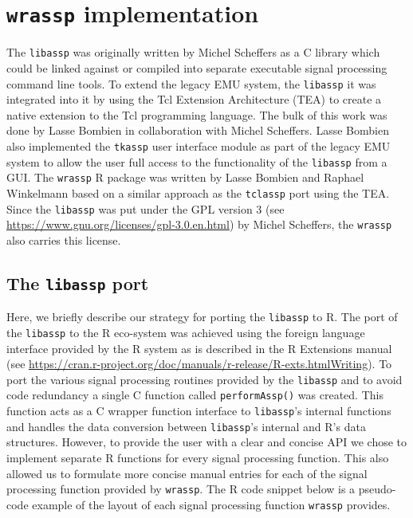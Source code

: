 \documentclass[]{book}
\theoremstyle{definition}
\theoremstyle{definition}
\theoremstyle{definition}
\theoremstyle{remark}
\begin{document}
\hypertarget{chap:wrassp_impl}{%
\chapter{\texorpdfstring{\texttt{wrassp}
implementation}{wrassp implementation}}\label{chap:wrassp_impl}}

The \texttt{libassp} was originally written by Michel Scheffers as a C
library which could be linked against or compiled into separate
executable signal processing command line tools. To extend the legacy
EMU system, the \texttt{libassp} it was integrated into it by using the
Tcl Extension Architecture (TEA) to create a native extension to the Tcl
programming language. The bulk of this work was done by Lasse Bombien in
collaboration with Michel Scheffers. Lasse Bombien also implemented the
\texttt{tkassp} user interface module as part of the legacy EMU system
to allow the user full access to the functionality of the
\texttt{libassp} from a GUI. The \texttt{wrassp} R package was written
by Lasse Bombien and Raphael Winkelmann based on a similar approach as
the \texttt{tclassp} port using the TEA. Since the \texttt{libassp} was
put under the GPL version 3 (see
\url{https://www.gnu.org/licenses/gpl-3.0.en.html}) by Michel Scheffers,
the \texttt{wrassp} also carries this license.

\hypertarget{the-libassp-port}{%
\section{\texorpdfstring{The \texttt{libassp}
port}{The libassp port}}\label{the-libassp-port}}

Here, we briefly describe our strategy for porting the \texttt{libassp}
to R. The port of the \texttt{libassp} to the R eco-system was achieved
using the foreign language interface provided by the R system as is
described in the R Extensions manual (see
\url{https://cran.r-project.org/doc/manuals/r-release/R-exts.htmlWriting}).
To port the various signal processing routines provided by the
\texttt{libassp} and to avoid code redundancy a single C function called
\texttt{performAssp()} was created. This function acts as a C wrapper
function interface to \texttt{libassp}'s internal functions and handles
the data conversion between \texttt{libassp}'s internal and R's data
structures. However, to provide the user with a clear and concise API we
chose to implement separate R functions for every signal processing
function. This also allowed us to formulate more concise manual entries
for each of the signal processing function provided by \texttt{wrassp}.
The R code snippet below is a pseudo-code example of the layout of each
signal processing function \texttt{wrassp} provides.
\end{document}
